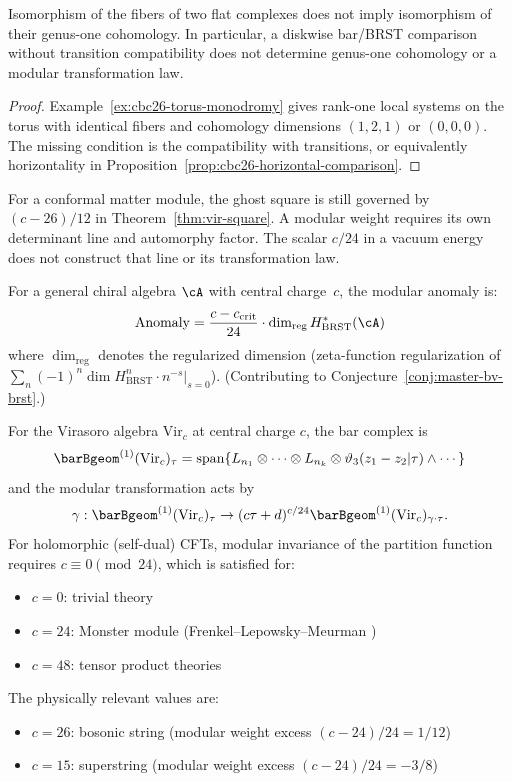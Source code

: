 \begin{proposition}
\label{thm:modular-anomaly-km-w}
Isomorphism of the fibers of two flat complexes does not imply isomorphism of their genus-one cohomology.
In particular, a diskwise bar/BRST comparison without transition compatibility does not determine genus-one cohomology or a modular transformation law.
\end{proposition}

\begin{proof}
Example~\ref{ex:cbc26-torus-monodromy} gives rank-one local systems on the torus with identical fibers and cohomology dimensions $(1,2,1)$ or $(0,0,0)$.
The missing condition is the compatibility with transitions, or equivalently horizontality in Proposition~\ref{prop:cbc26-horizontal-comparison}.
\end{proof}

For a conformal matter module, the ghost square is still governed by $(c-26)/12$ in Theorem~\ref{thm:vir-square}.
A modular weight requires its own determinant line and automorphy factor.
The scalar $c/24$ in a vacuum energy does not construct that line or its transformation law.

\begin{conjecture}
\label{conj:modular-anomaly-brst}
For a general chiral algebra $\cA$ with central charge~$c$,
the modular anomaly is:
\[
\mathrm{Anomaly} = \frac{c - c_{\mathrm{crit}}}{24}
\cdot \dim_{\mathrm{reg}} H^*_{\mathrm{BRST}}(\cA)
\]
where $\dim_{\mathrm{reg}}$ denotes the regularized
dimension \textup{(}zeta-function regularization of
$\sum_n (-1)^n \dim H^n_{\mathrm{BRST}} \cdot
n^{-s}|_{s=0}$\textup{)}.
(Contributing to Conjecture~\ref{conj:master-bv-brst}.)
\end{conjecture}


\begin{example}
For the Virasoro algebra $\text{Vir}_c$ at central charge $c$, the bar complex is
\[\barBgeom^{(1)}(\text{Vir}_c)_\tau = \text{span}\{L_{n_1} \otimes \cdots \otimes L_{n_k} \otimes \vartheta_3(z_1-z_2|\tau) \wedge \cdots\}\]
and the modular transformation acts by
\[\gamma: \barBgeom^{(1)}(\text{Vir}_c)_\tau \to (c\tau + d)^{c/24} \barBgeom^{(1)}(\text{Vir}_c)_{\gamma \cdot \tau}.\]
For holomorphic (self-dual) CFTs, modular invariance of the partition function requires $c \equiv 0 \pmod{24}$, which is satisfied for:
\begin{itemize}
\item $c = 0$: trivial theory
\item $c = 24$: Monster module (Frenkel--Lepowsky--Meurman \cite{FLM88})
\item $c = 48$: tensor product theories
\end{itemize}
The physically relevant values are:
\begin{itemize}
\item $c = 26$: bosonic string (modular weight excess $(c-24)/24 = 1/12$)
\item $c = 15$: superstring (modular weight excess $(c-24)/24 = -3/8$)
\end{itemize}
\end{example}


